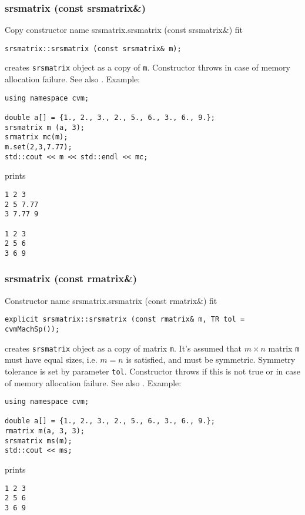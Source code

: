 \subsubsection{srsmatrix (const srsmatrix\&)}
Copy constructor%
\pdfdest name {srsmatrix.srsmatrix (const srsmatrix&)} fit
\begin{verbatim}
srsmatrix::srsmatrix (const srsmatrix& m);
\end{verbatim}
creates  \verb"srsmatrix" object as a copy of \verb"m".
Constructor throws  
in case of memory allocation failure.
See also .
Example:
\begin{Verbatim}
using namespace cvm;

double a[] = {1., 2., 3., 2., 5., 6., 3., 6., 9.};
srsmatrix m (a, 3);
srmatrix mc(m);
m.set(2,3,7.77);
std::cout << m << std::endl << mc;
\end{Verbatim}
prints
\begin{Verbatim}
1 2 3
2 5 7.77
3 7.77 9

1 2 3
2 5 6
3 6 9
\end{Verbatim}
\newpage



\subsubsection{srsmatrix (const rmatrix\&)}
Constructor%
\pdfdest name {srsmatrix.srsmatrix (const rmatrix&)} fit
\begin{verbatim}
explicit srsmatrix::srsmatrix (const rmatrix& m, TR tol = cvmMachSp());
\end{verbatim}
creates  \verb"srsmatrix" object as a copy of matrix \verb"m".
It's assumed that $m\times n$ matrix \verb"m" must have equal
sizes, i.e. $m = n$ is satisfied, and must be symmetric.
Symmetry tolerance is set by parameter \verb'tol'.
Constructor throws  
if this is not true or in case of memory allocation failure.
See also .
Example:
\begin{Verbatim}
using namespace cvm;

double a[] = {1., 2., 3., 2., 5., 6., 3., 6., 9.};
rmatrix m(a, 3, 3);
srsmatrix ms(m);
std::cout << ms;
\end{Verbatim}
prints
\begin{Verbatim}
1 2 3
2 5 6
3 6 9
\end{Verbatim}
\newpage



